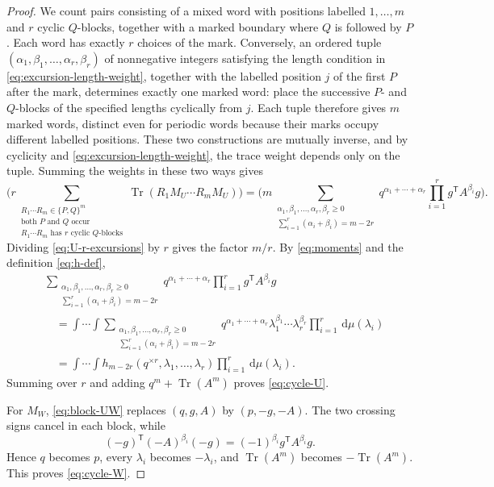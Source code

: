 \documentclass[11pt]{article}
\theoremstyle{remark}
\numberwithin{equation}{section}
\newcommand{\Tr}{\operatorname{Tr}}
\newcommand{\dd}{\,\mathrm d}
\newcommand{\rep}[2]{#1^{\times #2}}
\begin{document}
\begin{proof}
  We count pairs consisting of a mixed word with positions labelled $1,\ldots,m$ and $r$ cyclic $Q$-blocks, together with a marked boundary where $Q$ is followed by $P$.
  Each word has exactly $r$ choices of the mark.
  Conversely, an ordered tuple $(\alpha_1,\beta_1,\ldots,\alpha_r,\beta_r)$ of nonnegative integers satisfying the length condition in \eqref{eq:excursion-length-weight}, together with the labelled position $j$ of the first $P$ after the mark, determines exactly one marked word: place the successive $P$- and $Q$-blocks of the specified lengths cyclically from $j$.
  Each tuple therefore gives $m$ marked words, distinct even for periodic words because their marks occupy different labelled positions.
  These two constructions are mutually inverse, and by cyclicity and \eqref{eq:excursion-length-weight}, the trace weight depends only on the tuple.
  Summing the weights in these two ways gives
  \begin{equation}\label{eq:U-r-excursions}
      \Bigg(
        r\!\!\!\!
        \sum_{\substack{R_1\cdots R_m\in\{P,Q\}^m\\
                       \text{both $P$ and $Q$ occur}\\
                       R_1\cdots R_m\text{ has }r\text{ cyclic $Q$-blocks}}}
        \Tr(R_1M_U\cdots R_mM_U)\Bigg)
      =
      \Bigg(
        m \!\!\!\!
        \sum_{\substack{\alpha_1,\beta_1,\ldots,
                          \alpha_r,\beta_r\ge0\\
                          \sum_{i=1}^r(\alpha_i+\beta_i)=m-2r}}
        q^{\alpha_1+\cdots+\alpha_r}
        \prod_{i=1}^rg^{\mathsf T}A^{\beta_i}g\Bigg).
  \end{equation}
  Dividing \eqref{eq:U-r-excursions} by $r$ gives the factor $m/r$.
  By \eqref{eq:moments} and the definition \eqref{eq:h-def},
  \begin{align*}
    &\sum_{\substack{\alpha_1,\beta_1,\ldots,\alpha_r,\beta_r\ge0\\
                     \sum_{i=1}^r(\alpha_i+\beta_i)=m-2r}}
      q^{\alpha_1+\cdots+\alpha_r}
      \prod_{i=1}^rg^{\mathsf T}A^{\beta_i}g\\
    &\quad=\int\!\cdots\!\int
      \sum_{\substack{\alpha_1,\beta_1,\ldots,\alpha_r,\beta_r\ge0\\
                     \sum_{i=1}^r(\alpha_i+\beta_i)=m-2r}}
      q^{\alpha_1+\cdots+\alpha_r}
      \lambda_1^{\beta_1}\cdots\lambda_r^{\beta_r}
      \prod_{i=1}^r\dd\mu(\lambda_i)\\
    &\quad=\int\!\cdots\!\int
      h_{m-2r}(\rep qr,\lambda_1,\ldots,\lambda_r)
      \prod_{i=1}^r\dd\mu(\lambda_i).
  \end{align*}
  Summing over $r$ and adding $q^m+\Tr(A^m)$ proves \eqref{eq:cycle-U}.

  For $M_W$, \eqref{eq:block-UW} replaces
  $(q,g,A)$ by $(p,-g,-A)$.  The two crossing signs cancel in each block,
  while
  \[
    (-g)^{\mathsf T}(-A)^{\beta_i}(-g)
    =(-1)^{\beta_i}g^{\mathsf T}A^{\beta_i}g.
  \]
  Hence $q$ becomes $p$, every $\lambda_i$ becomes $-\lambda_i$, and
  $\Tr(A^m)$ becomes $-\Tr(A^m)$.  This proves \eqref{eq:cycle-W}.
\end{proof}
\end{document}
